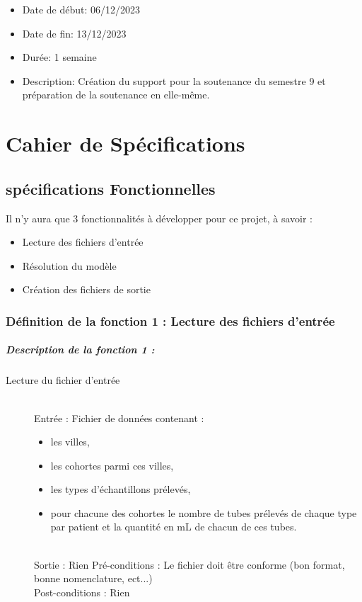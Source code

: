 \documentclass{polytech/polytech}
\numberwithin{figure}{chapter}
\begin{document}
\begin{appendix}
\begin{itemize}
    \item Date de début: 06/12/2023
    \item Date de fin: 13/12/2023
    \item Durée: 1 semaine
    \item
        Description: Création du support pour la soutenance du semestre 9 et préparation de la soutenance en elle-même. 
\end{itemize}

\chapter{Cahier de Spécifications}

\section{spécifications Fonctionnelles}
Il n'y aura que 3 fonctionnalités à développer pour ce projet, à savoir : 
\begin{itemize}
    \item Lecture des fichiers d'entrée
    \item Résolution du modèle
    \item Création des fichiers de sortie
\end{itemize}


\subsection{ Définition de la fonction 1 : Lecture des fichiers d'entrée}

\paragraph{Description de la fonction 1 :}
 
\begin{description}
    \item[Lecture du fichier d'entrée] ~ \\
        Entrée : Fichier de données contenant :
        \begin{itemize}
            \item les villes,
            \item les cohortes parmi ces villes,
            \item les types d'échantillons prélevés,
            \item pour chacune des cohortes le nombre de tubes prélevés de chaque type par patient et la quantité en mL de chacun de ces tubes. 
        \end{itemize} \\
        Sortie : Rien
        Pré-conditions : Le fichier doit être conforme (bon format, bonne nomenclature, ect...) \\
        Post-conditions : Rien
\end{description}


\end{appendix}
\end{document}
